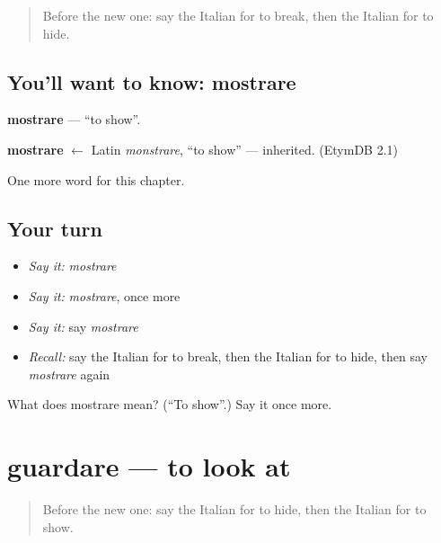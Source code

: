 \label{lesson:IT-C142-mostrare}



\begin{quote}
Before the new one: say the Italian for to break, then the Italian for to hide.
\end{quote}

\subsection*{You'll want to know: mostrare}
\textbf{mostrare} — \textquotedblleft{}to show\textquotedblright{}.

\begin{cousinweb}
\textbf{mostrare} $\leftarrow$ Latin \emph{monstrare}, \textquotedblleft{}to show\textquotedblright{} — inherited. (EtymDB 2.1)
\end{cousinweb}

\begin{grammarlens}[title={What you've built}]
One more word for this chapter.
\end{grammarlens}

\subsection*{Your turn}
\begin{itemize}
\raggedright
  \item \emph{Say it:} \emph{mostrare}
  \item \emph{Say it:} \emph{mostrare}, once more
  \item \emph{Say it:} say \emph{mostrare}
  \item \emph{Recall:} say the Italian for to break, then the Italian for to hide, then say \emph{mostrare} again
\end{itemize}

\begin{tcolorbox}[breakable,colback=teal!4,colframe=teal!35!black,title={Before you move on}]
What does mostrare mean? (\textquotedblleft{}To show\textquotedblright{}.) Say it once more.
\end{tcolorbox}
\section[guardare]{guardare — to look at}

\label{lesson:IT-C142-guardare}



\begin{quote}
Before the new one: say the Italian for to hide, then the Italian for to show.
\end{quote}

